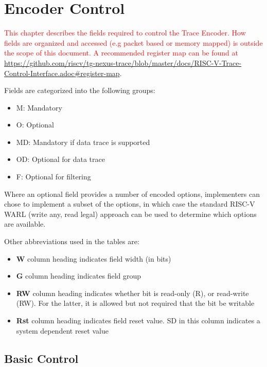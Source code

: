 \chapter{Encoder Control} \label{encoderControl}

\textcolor{red}{This chapter describes the fields required to control the Trace Encoder.  
How fields are organized and accessed (e.g packet based or memory mapped) is outside the scope of this document.  
A recommended register map can be found at} \href{https://github.com/riscv/tg-nexus-trace/blob/master/docs/RISC-V-Trace-Control-Interface.adoc#register-map}
{https://github.com/riscv/tg-nexus-trace/blob/master/docs/RISC-V-Trace-Control-Interface.adoc\#register-map}.

Fields are categorized into the following groups:

\begin{itemize}
  \item M: Mandatory
  \item O: Optional
  \item MD: Mandatory if data trace is supported
  \item OD: Optional for data trace
  \item F: Optional for filtering
\end{itemize}

Where an optional field provides a number of encoded options, implementers can chose to implement a subset of the options, 
in which case the standard RISC-V WARL (write any, read legal) approach can be used to determine which options are available.

Other abbreviations used in the tables are:
\begin{itemize}
  \item \textbf{W} column heading indicates field width (in bits)
  \item \textbf{G} column heading indicates field group
  \item \textbf{RW} column heading indicates whether bit is read-only (R), or read-write (RW).  
    For the latter, it is allowed but not required that the bit be writable
  \item \textbf{Rst} column heading indicates field reset value. SD in this column indicates a system dependent reset value
\end{itemize}

\section{Basic Control} \label{sec:ctl-basic}

